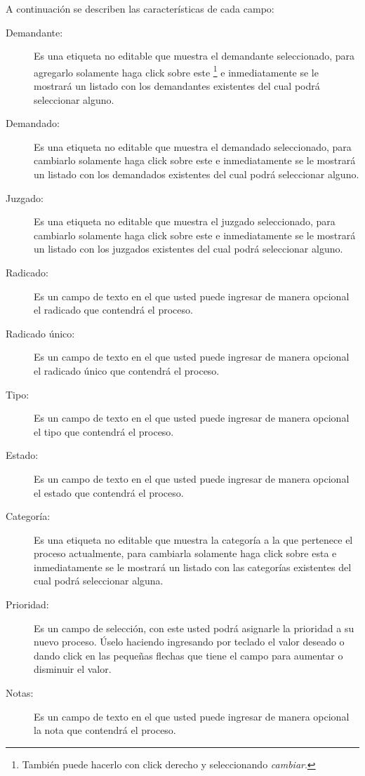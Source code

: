  A continuaci\'on se describen las
caracter\'isticas de cada campo:
\begin{description}
\item[Demandante:]Es una etiqueta no editable que muestra el demandante
seleccionado, para agregarlo solamente haga click sobre este
\footnote{Tambi\'en puede hacerlo con click derecho y seleccionando \emph{cambiar}.}
e inmediatamente se
le mostrar\'a un listado con los demandantes existentes del cual podr\'a
seleccionar alguno.
\item[Demandado:]Es una etiqueta no editable que muestra el demandado
seleccionado, para cambiarlo solamente haga click sobre este
\footnotemark[\value{footnote}]
e inmediatamente
se le mostrar\'a un listado con los demandados existentes del cual podr\'a
seleccionar alguno.
\item[Juzgado:]Es una etiqueta no editable que muestra el juzgado
seleccionado, para cambiarlo solamente haga click sobre este
\footnotemark[\value{footnote}]
e inmediatamente
se le mostrar\'a un listado con los juzgados existentes del cual podr\'a
seleccionar alguno.
\item[Radicado:]Es un campo de texto en el que usted puede ingresar de manera
opcional el radicado que contendr\'a el proceso.
\item[Radicado \'unico:]Es un campo de texto en el que usted puede ingresar de
manera opcional el radicado \'unico que contendr\'a el proceso.
\item[Tipo:]Es un campo de texto en el que usted puede ingresar de manera
opcional el tipo que contendr\'a el proceso.
\item[Estado:]Es un campo de texto en el que usted puede ingresar de manera
opcional el estado que contendr\'a el proceso.
\item[Categor\'ia:]Es una etiqueta no editable que muestra la categor\'ia
a la que pertenece el proceso actualmente, para cambiarla solamente haga click
sobre esta
\footnotemark[\value{footnote}]
e inmediatamente
se le mostrar\'a un listado con las categor\'ias existentes del cual podr\'a
seleccionar alguna.
\item[Prioridad:]Es un campo de selecci\'on, con este usted podr\'a asignarle
la prioridad a su nuevo proceso. \'Uselo haciendo ingresando por teclado el valor deseado o dando click en las peque\~nas flechas que tiene el campo para aumentar o disminuir el valor.
\item[Notas:]Es un campo de texto en el que usted puede ingresar de manera
opcional la nota que contendr\'a el proceso.
\end{description}

